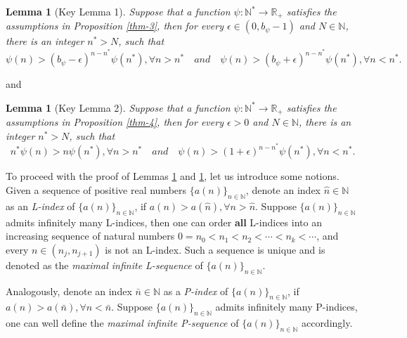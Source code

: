 \documentclass[12pt,reqno]{amsart}
\renewcommand{\=}{\coloneqq}
\theoremstyle{plain}
\newtheorem{lemma}[theorem]{Lemma}
\begin{document}
\begin{lemma}[Key Lemma 1]\label{cor-1}
Suppose that a function $\psi:\mathbb{N}^{*}\to\mathbb{R}_{+}$ satisfies the assumptions in Proposition \ref{thm-3}, then for every $\epsilon \in (0, b_{\psi}-1)$ and $N\in\mathbb{N}$, there is an integer $n^*>N$, such that
\begin{equation}\label{equ-8}
\psi(n)>(b_{\psi}-\epsilon)^{n-n^*} \psi(n^{*}), \forall n>n^* \quad and \quad \psi(n) > (b_{\psi}+\epsilon)^{n-n^{*}} \psi(n^*), \forall n <n^*.
\end{equation}
\end{lemma}
and
\begin{lemma}[Key Lemma 2]\label{cor-2}
Suppose that a function $\psi:\mathbb{N}^{*}\to\mathbb{R}_{+}$ satisfies the assumptions in Proposition \ref{thm-4}, then for every $\epsilon>0$ and $N\in\mathbb{N}$, there is an integer $n^*>N$, such that
\begin{equation}\label{equ-9}
n^* \psi(n)>n \psi(n^*), \forall n>n^* \quad and \quad \psi(n) > (1+\epsilon)^{n-n^*} \psi(n^*), \forall n<n^*.
\end{equation}
\end{lemma}
To proceed with the proof of Lemmas \ref{cor-1} and \ref{cor-2}, let us introduce some notions. Given a sequence of positive real numbers $\{a(n)\}_{n\in\mathbb{N}}$, denote an index $\hat{n}\in \mathbb{N}$ as an \emph{L-index} of $\{a(n)\}_{n\in\mathbb{N}}$, if $a(n) > a(\hat{n}),\forall n>\hat{n}$. Suppose $\{a(n)\}_{n\in\mathbb{N}}$ admits infinitely many L-indices, then one can order \textbf{all} L-indices into an increasing sequence of natural numbers $0=n_0<n_1<n_2<\cdots<n_k<\cdots$, and every $n\in (n_{j},n_{j+1})$ is not an L-index. Such a sequence is unique and is denoted as the \emph{maximal infinite L-sequence} of $\{a(n)\}_{n\in\mathbb{N}}$.

Analogously, denote an index $\bar{n}\in \mathbb{N}$ as a \emph{P-index} of $\{a(n)\}_{n\in\mathbb{N}}$, if $a(n) > a(\bar{n}), \forall n<\bar{n}$. Suppose $\{a(n)\}_{n\in\mathbb{N}}$ admits infinitely many P-indices, one can well define the \emph{maximal infinite P-sequence} of $\{a(n)\}_{n\in\mathbb{N}}$ accordingly.

\medskip
	
\end{document}
